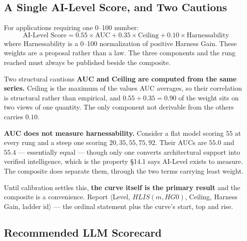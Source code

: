 \subsection{A Single AI-Level Score, and Two Cautions}\label{sec:composite}

For applications requiring one 0--100 number:
\begin{equation}
\text{AI-Level Score} = 0.55 \times \text{AUC} + 0.35 \times \text{Ceiling} + 0.10 \times \text{Harnessability}
\end{equation}
where Harnessability is a 0--100 normalization of positive Harness Gain. These weights are a proposal rather than a law. The three components and the rung reached must always be published beside the composite.

\begin{cautionbox}{Two structural cautions}
\textbf{AUC and Ceiling are computed from the same series.} Ceiling is the maximum of the values AUC averages, so their correlation is structural rather than empirical, and $0.55 + 0.35 = 0.90$ of the weight sits on two views of one quantity. The only component not derivable from the others carries $0.10$.

\textbf{AUC does not measure harnessability.} Consider a flat model scoring $55$ at every rung and a steep one scoring $20, 35, 55, 75, 92$. Their AUCs are $55.0$ and $55.4$ --- essentially equal --- though only one converts architectural support into verified intelligence, which is the property \S14.1 says AI-Level exists to measure. The composite does separate them, through the two terms carrying least weight.

Until calibration settles this, \textbf{the curve itself is the primary result} and the composite is a convenience. Report $\langle$Level, $HLIS(m,HG0)$, Ceiling, Harness Gain, ladder id$\rangle$ --- the ordinal statement plus the curve's start, top and rise.
\end{cautionbox}

\subsection{Recommended LLM Scorecard}

